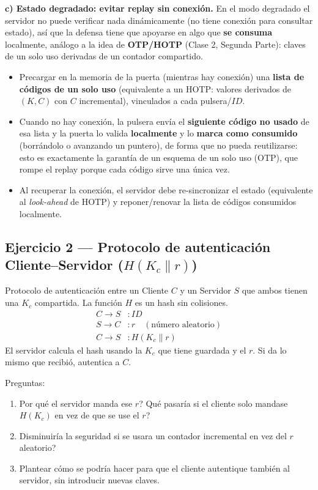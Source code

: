 \textbf{c) Estado degradado: evitar replay sin conexión.}
En el modo degradado el servidor no puede verificar nada dinámicamente (no tiene
conexión para consultar estado), así que la defensa tiene que apoyarse en algo que
\textbf{se consuma} localmente, análogo a la idea de \textbf{OTP/HOTP} (Clase 2,
Segunda Parte): claves de un solo uso derivadas de un contador compartido.
\begin{itemize}
  \item Precargar en la memoria de la puerta (mientras hay conexión) una
  \textbf{lista de códigos de un solo uso} (equivalente a un HOTP: valores derivados
  de $(K, C)$ con $C$ incremental), vinculados a cada pulsera/$ID$.
  \item Cuando no hay conexión, la pulsera envía el \textbf{siguiente código no usado}
  de esa lista y la puerta lo valida \textbf{localmente} y lo \textbf{marca como
  consumido} (borrándolo o avanzando un puntero), de forma que no pueda reutilizarse:
  esto es exactamente la garantía de un esquema de un solo uso (OTP), que rompe el
  replay porque cada código sirve una única vez.
  \item Al recuperar la conexión, el servidor debe re-sincronizar el estado
  (equivalente al \emph{look-ahead} de HOTP) y reponer/renovar la lista de códigos
  consumidos localmente.
\end{itemize}

\subsection{Ejercicio 2 --- Protocolo de autenticación Cliente--Servidor ($H(K_c\|r)$)}

\begin{consigna}
Protocolo de autenticación entre un Cliente $C$ y un Servidor $S$ que ambos tienen
una $K_c$ compartida. La función $H$ es un hash sin colisiones.
\begin{align*}
C \to S &: ID\\
S \to C &: r \quad (\text{número aleatorio})\\
C \to S &: H(K_c \| r)
\end{align*}
El servidor calcula el hash usando la $K_c$ que tiene guardada y el $r$. Si da lo
mismo que recibió, autentica a $C$.

Preguntas:
\begin{enumerate}
  \item[1.] \textquestiondown{}Por qué el servidor manda ese $r$? \textquestiondown{}Qué pasaría si el cliente solo
  mandase $H(K_c)$ en vez de que se use el $r$?
  \item[2.] \textquestiondown{}Disminuiría la seguridad si se usara un contador incremental en vez
  del $r$ aleatorio?
  \item[3.] Plantear cómo se podría hacer para que el cliente autentique también al
  servidor, sin introducir nuevas claves.
\end{enumerate}
\end{consigna}

